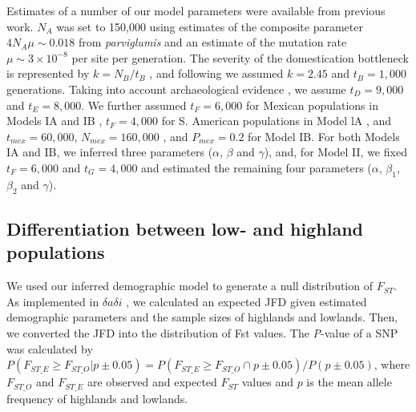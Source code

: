 Estimates of a number of our model parameters were available from previous work.    
$N_A$ was set to 150,000 using estimates of the composite parameter $4N_A\mu \sim 0.018$ from \emph{parviglumis}  \cite[]{Eyre-Walker_1998_9539756,Tenaillon_2001_11470895,Tenaillon_2004_15014173,Wright_2005_15919994,Ross-Ibarra_2009_19153259} and an estimate of the mutation rate $\mu \sim 3\times 10^{-8}$ \cite[]{Clark_2005_16079248} per site per generation.  
The severity of the domestication bottleneck is represented by $k=N_B/t_B$ \cite[]{Eyre-Walker_1998_9539756,Wright_2005_15919994}, and following \cite{Wright_2005_15919994} we assumed $k=2.45$ and $t_B=1,000$ generations.  
Taking into account archaeological evidence \cite[]{Piperno_2009_19307570}, we assume $t_D=9,000$ and $t_E=8,000$.  
We further assumed $t_F=6,000$ for Mexican populations in Models IA and IB \cite[]{Piperno_2006_69}, $t_F=4,000$ for S. American populations in Model lA \cite[]{Perry_2006_16511492,Grobman_2012_22307642}, and $t_{mex}=60,000$, $N_{mex}=160,000$ \cite[]{Ross-Ibarra_2009_19153259}, and $P_{mex}=0.2$ \cite[]{vanHeerwaarden_2011_21189301} for Model IB. 
For both Models IA and IB, we inferred three parameters ($\alpha$, $\beta$ and $\gamma$), and, for Model II, we fixed $t_F=6,000$ and $t_G=4,000$ \cite[]{Piperno_2006_69,Perry_2006_16511492,Grobman_2012_22307642}  and estimated the remaining four parameters ($\alpha$, $\beta_1$, $\beta_2$ and $\gamma$).

\subsection*{Differentiation between low- and highland populations}
We used our inferred demographic model to generate a null distribution of $F_{ST}$.
As implemented in $\delta a \delta i$ \cite[]{Gutenkunst_2009_19851460}, we calculated an expected JFD given estimated demographic parameters and the sample sizes of highlands and lowlands.
Then, we converted the JFD into the distribution of Fst values.
The \emph{P}-value of a SNP was calculated by $P(F_{ST\_E}\geq F_{ST\_O}|p\pm 0.05) = P(F_{ST\_E}\geq F_{ST\_O} \cap p\pm 0.05)/P(p\pm 0.05)$, 
where $F_{ST\_O}$ and $F_{ST\_E}$ are observed and expected $F_{ST}$ values and $p$ is the mean allele frequency of highlands and lowlands.

